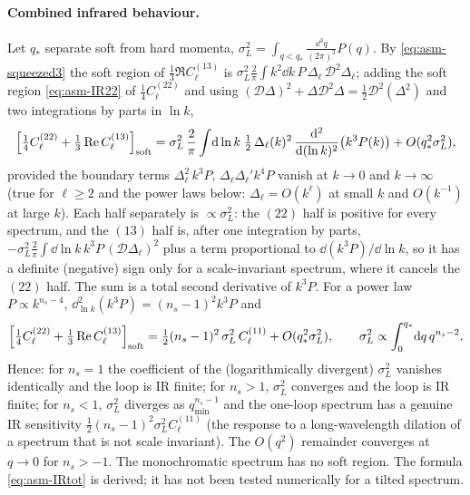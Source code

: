 \paragraph{Combined infrared behaviour.}  Let $q_*$ separate soft from hard momenta, $\sigma_L^2=\int_{q<q_*}\frac{\dd^3q}{(2\pi)^3}P(q)$.  By
\eqref{eq:asm-squeezed3} the soft region of $\tfrac13\Re C^{(13)}_\ell$ is $\sigma_L^2\frac2\pi\int k^2\dd k\,P\,\Delta_\ell\,\mathcal D^2\Delta_\ell$; adding the
soft region \eqref{eq:asm-IR22} of $\tfrac14C^{(22)}_\ell$ and using $(\mathcal D\Delta)^2+\Delta\mathcal D^2\Delta=\tfrac12\mathcal D^2(\Delta^2)$ and two
integrations by parts in $\ln k$,
\begin{equation}
\Big[\tfrac14C^{(22)}_\ell+\tfrac13\operatorname{Re} C^{(13)}_\ell\Big]_{\rm soft}
=\sigma_L^2\,\frac2\pi\int\!\mathrm d\ln k\;\tfrac12\,\Delta_\ell(k)^2\,\frac{\mathrm d^2}{\mathrm d(\ln k)^2}\big(k^3P(k)\big)+O(q_*^2\sigma_L^2),
\label{eq:asm-IRtot}
\end{equation}
provided the boundary terms $\Delta_\ell^2\,k^3P$, $\Delta_\ell\Delta_\ell'k^4P$ vanish at $k\to0$ and $k\to\infty$ (true for $\ell\ge2$ and the power laws
below: $\Delta_\ell=O(k^\ell)$ at small $k$ and $O(k^{-1})$ at large $k$).  Each half separately is $\propto\sigma_L^2$: the $(22)$ half is positive for every spectrum,
and the $(13)$ half is, after one integration by parts, $-\sigma_L^2\frac2\pi\int\dd\ln k\,k^3P\,(\mathcal D\Delta_\ell)^2$ plus a term proportional to
$\dd(k^3P)/\dd\ln k$, so it has a definite (negative) sign only for a scale-invariant spectrum, where it cancels the $(22)$ half.  The sum is a total
second derivative of $k^3P$.  For a power law $P\propto k^{n_s-4}$, $\dd^2_{\ln k}(k^3P)=(n_s-1)^2k^3P$ and
\begin{equation}
\Big[\tfrac14C^{(22)}_\ell+\tfrac13\operatorname{Re} C^{(13)}_\ell\Big]_{\rm soft}=\tfrac12(n_s-1)^2\,\sigma_L^2\,C^{(11)}_\ell+O(q_*^2\sigma_L^2),\qquad
\sigma_L^2\propto\int_0^{q_*}\!\mathrm d q\,q^{n_s-2}.
\label{eq:asm-IRns}
\end{equation}
Hence: for $n_s=1$ the coefficient of the (logarithmically divergent) $\sigma_L^2$ vanishes identically and the loop is IR finite; for
$n_s>1$, $\sigma_L^2$ converges and the loop is IR finite; for $n_s<1$, $\sigma_L^2$ diverges as $q_{\min}^{n_s-1}$ and the one-loop spectrum has
a genuine IR sensitivity $\tfrac12(n_s-1)^2\sigma_L^2C^{(11)}_\ell$ (the response to a long-wavelength dilation of a spectrum that is not scale
invariant).  The $O(q^2)$ remainder converges at $q\to0$ for $n_s>-1$.  The monochromatic spectrum has no soft region.  The formula
\eqref{eq:asm-IRtot} is derived; it has not been tested numerically for a tilted spectrum.

